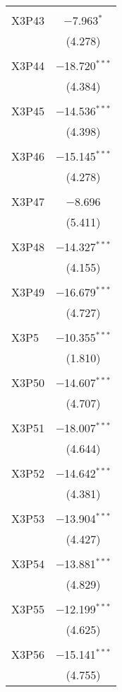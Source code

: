 \begin{table}[!htbp]
\begin{tabular}{@{\extracolsep{5pt}}lc}
  & \\ 
 X3P43 & $-$7.963$^{*}$ \\ 
  & (4.278) \\ 
  & \\ 
 X3P44 & $-$18.720$^{***}$ \\ 
  & (4.384) \\ 
  & \\ 
 X3P45 & $-$14.536$^{***}$ \\ 
  & (4.398) \\ 
  & \\ 
 X3P46 & $-$15.145$^{***}$ \\ 
  & (4.278) \\ 
  & \\ 
 X3P47 & $-$8.696 \\ 
  & (5.411) \\ 
  & \\ 
 X3P48 & $-$14.327$^{***}$ \\ 
  & (4.155) \\ 
  & \\ 
 X3P49 & $-$16.679$^{***}$ \\ 
  & (4.727) \\ 
  & \\ 
 X3P5 & $-$10.355$^{***}$ \\ 
  & (1.810) \\ 
  & \\ 
 X3P50 & $-$14.607$^{***}$ \\ 
  & (4.707) \\ 
  & \\ 
 X3P51 & $-$18.007$^{***}$ \\ 
  & (4.644) \\ 
  & \\ 
 X3P52 & $-$14.642$^{***}$ \\ 
  & (4.381) \\ 
  & \\ 
 X3P53 & $-$13.904$^{***}$ \\ 
  & (4.427) \\ 
  & \\ 
 X3P54 & $-$13.881$^{***}$ \\ 
  & (4.829) \\ 
  & \\ 
 X3P55 & $-$12.199$^{***}$ \\ 
  & (4.625) \\ 
  & \\ 
 X3P56 & $-$15.141$^{***}$ \\ 
  & (4.755) \\ 

\end{tabular}
\end{table}
